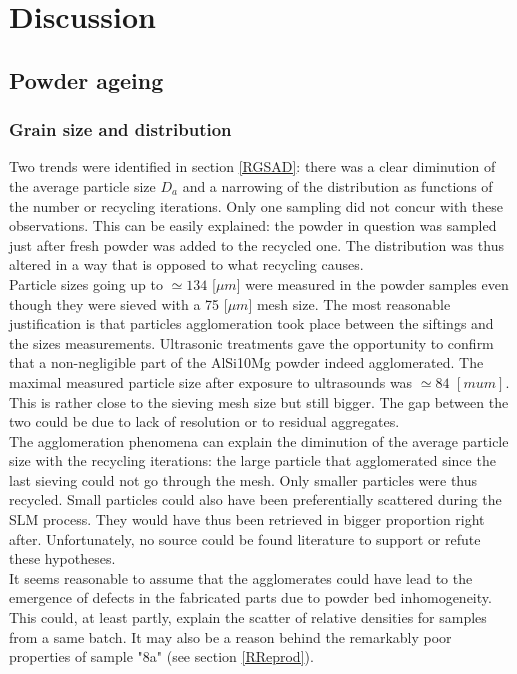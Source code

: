 \chapter{Discussion}
\label{Chap5}
\section{Powder ageing}
\subsection{Grain size and distribution}

Two trends were identified in section \ref{RGSAD}: there was a clear diminution of the average particle size $D_a$ and a narrowing of the distribution as functions of the number or recycling iterations. Only one sampling did not concur with these observations. This can be easily explained: the powder in question was sampled just after fresh powder was added to the recycled one. The distribution was thus altered in a way that is opposed to what recycling causes. \\

Particle sizes going up to $\simeq 134$ [$\mu m$] were measured in the powder samples even though they were sieved with a 75 [$\mu m$] mesh size. The most reasonable justification is that particles agglomeration took place between the siftings and the sizes measurements. Ultrasonic treatments gave the opportunity to confirm that a non-negligible part of the AlSi10Mg powder indeed agglomerated. The maximal measured particle size after exposure to ultrasounds was $\simeq 84$ $[mu m]$. This is rather close to the sieving mesh size but still bigger. The gap between the two could be due to lack of resolution or to residual aggregates.\\

The agglomeration phenomena can explain the diminution of the average particle size with the recycling iterations: the large particle that agglomerated since the last sieving could not go through the mesh. Only smaller particles were thus recycled. Small particles could also have been preferentially scattered during the SLM process. They would have thus been retrieved in bigger proportion right after. Unfortunately, no source could be found literature to support or refute these hypotheses.\\

 It seems reasonable to assume that the agglomerates could have lead to the emergence of defects in the fabricated parts due to powder bed inhomogeneity. This could, at least partly, explain the scatter of relative densities for samples from a same batch. It may also be a reason behind the remarkably poor properties of sample "8a" (see section \ref{RReprod}).\\
